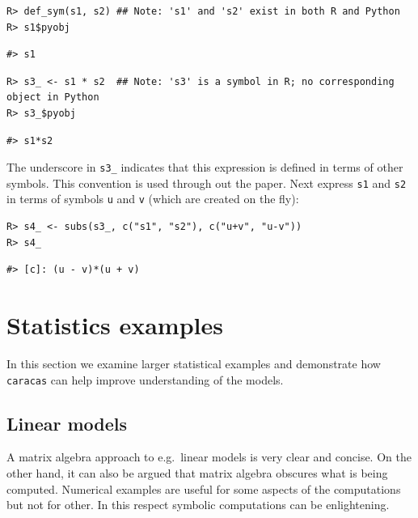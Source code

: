 \begin{verbatim}
R> def_sym(s1, s2) ## Note: 's1' and 's2' exist in both R and Python
R> s1$pyobj
\end{verbatim}

\begin{verbatim}
#> s1
\end{verbatim}

\begin{verbatim}
R> s3_ <- s1 * s2  ## Note: 's3' is a symbol in R; no corresponding object in Python
R> s3_$pyobj
\end{verbatim}

\begin{verbatim}
#> s1*s2
\end{verbatim}

The underscore in \texttt{s3\_} indicates that this expression
is defined in terms of other symbols. This convention is used through out the paper.
Next express \texttt{s1} and \texttt{s2} in terms of symbols \texttt{u} and \texttt{v} (which are created on the fly):

\begin{verbatim}
R> s4_ <- subs(s3_, c("s1", "s2"), c("u+v", "u-v"))
R> s4_
\end{verbatim}

\begin{verbatim}
#> [c]: (u - v)*(u + v)
\end{verbatim}

\hypertarget{statistics-examples}{%
\section{Statistics examples}\label{statistics-examples}}

In this section we examine larger statistical examples and
demonstrate how \texttt{caracas} can help improve understanding of the models.

\hypertarget{linear-models}{%
\subsection{Linear models}\label{linear-models}}

A matrix algebra approach to e.g.~linear models is very clear and
concise. On the other hand, it can also be argued that matrix algebra
obscures what is being computed. Numerical examples are useful for
some aspects of the computations but not for other. In this respect
symbolic computations can be enlightening.


